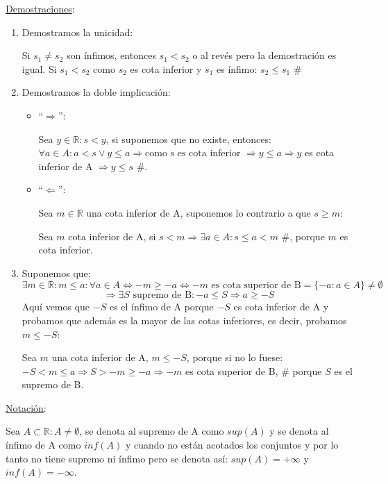 \documentclass[10pt,a4paper,openright]{book}
\theoremstyle{break}
\begin{document}
\underline{Demostraciones}:

\begin{enumerate}
\item Demostramos la unicidad:\par
Si $s_1\neq s_2$ son ínfimos, entonces $s_1<s_2$ o al revés pero la demostración es igual. Si $s_1<s_2$ como $s_2$ es cota inferior y $s_1$ es ínfimo: $s_2\leq s_1$ \#

\item Demostramos la doble implicación:
	\begin{itemize}
	\item ``$\Rightarrow$'':\par
	Sea $y\in \mathbb R: s<y$, si suponemos que no existe, entonces: $\forall a \in  A: a<s\vee y\leq a\Rightarrow\mbox{como s es cota inferior }\Rightarrow  y\leq a\Rightarrow y$ es cota inferior de A $\Rightarrow y\leq s$ \#.
	\item ``$\Leftarrow$'':\par
	Sea $m\in \mathbb R$ una cota inferior de A, suponemos lo contrario a que $s\geq m$:\par
	Sea $m$ cota inferior de A, si $s<m\Rightarrow \exists a\in A: s\leq a<m$ \#, porque $m$ es cota inferior.
	\end{itemize}
	
\item Suponemos que:
$$\exists m\in \mathbb R: m\leq a: \forall a\in A\Leftrightarrow -m\geq -a\Leftrightarrow -m\mbox{ es cota superior de B}=\{-a: a\in A\}\neq \emptyset$$
$$\Rightarrow \exists S\mbox{ supremo de B}: -a\leq S\Rightarrow a\geq -S$$
Aquí vemos que $-S$ es el ínfimo de A porque $-S$ es cota inferior de A y probamos que además es la mayor de las cotas inferiores, es decir, probamos $m\leq -S$:\par
Sea $m$ una cota inferior de A, $m\leq -S$, porque si no lo fuese:
$-S<m\leq a\Rightarrow S>-m\geq -a\Rightarrow -m$ es cota superior de B, \# porque $S$ es el supremo de B.
\end{enumerate}

\underline{Notación}:\par
Sea $A\subset \mathbb R: A\neq \emptyset$, se denota al supremo de A como $sup(A)$ y se denota al ínfimo de A como $inf(A)$ y cuando no están acotados los conjuntos y por lo tanto no tiene supremo ni ínfimo pero se denota así: $sup(A)=+\infty$ y $inf(A)=-\infty$.
\end{document}
